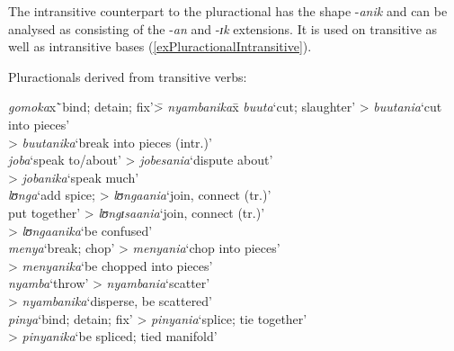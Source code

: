 \largerpage
The intransitive counterpart to the pluractional has the shape -\textit{anik} and can be analysed as consisting of the  -\textit{an} and  -\textit{ɪk} extensions. It is used on transitive as well as intransitive bases (\ref{exPluractionalIntransitive}).
\begin{exe}
\ex
\begin{xlist}
\ex Pluractionals derived from transitive verbs: \label{exPluractionalTransitive}
\begin{tabbing}
\textit{gomoka}x\=`bind; detain; fix'\=> \textit{nyambanika}x\= \kill%
\textit{buuta}\>`cut; slaughter'\> > \textit{buutania}\>`cut into pieces'\\
\>\> > \textit{buutanika}\>`break into pieces (intr.)'\\
\textit{joba}\>`speak to/about'\> > \textit{jobesania}\>`dispute about'\\
\>\> > \textit{jobanika}\>`speak much'\\ 
\textit{lʊnga}\>`add spice;\> > \textit{lʊngaania}\>`join, connect (tr.)'\\
\>put together'\> > \textit{lʊngɪsaania}\>`join, connect (tr.)'\\
\>\> > \textit{lʊngaanika}\>`be confused'\\
\textit{menya}\>`break; chop'\> > \textit{menyania}\>`chop into pieces'\\
\>\> > \textit{menyanika}\>`be chopped into pieces'\\ 
\textit{nyamba}\>`throw'\> > \textit{nyambania}\>`scatter'\\ \>\> > \textit{nyambanika}\>`disperse, be scattered'\\
\textit{pinya}\>`bind; detain; fix'\> > \textit{pinyania}\>`splice; tie together'\\
\>\> > \textit{pinyanika}\>`be spliced; tied manifold'\\ 
\end{tabbing}


\end{xlist}
\end{exe}

